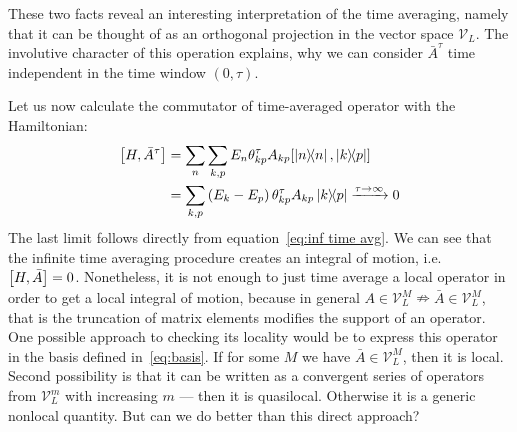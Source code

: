 These two facts reveal an interesting interpretation of the time averaging, namely that it can be
thought of as an orthogonal projection in the vector space \(\mathcal{V}_L\). The involutive character of this operation explains,
why we can consider \(\bar{A}^{\tau}\) time independent in the time window \(\left(0,\tau\right)\).

Let us now calculate the commutator of time-averaged operator with the Hamiltonian:
\begin{align}
  \comm{H}{\bar{A}^{\tau}} & = \sum_n \sum_{k,p} E_n \theta_{kp}^{\tau} A_{kp} \comm{ \ketbra{n}{n}}{ \ketbra{k}{p}} \nonumber         \\
                           & = \sum_{k,p} \left(E_k-E_p\right) \theta_{kp}^{\tau} A_{kp} \ketbra{k}{p} \xrightarrow{\tau \to \infty} 0 \label{eq:time averaged commutator}
\end{align}
The last limit follows directly from equation~\eqref{eq:inf time avg}. We can see that the infinite time averaging procedure
creates an integral of motion, i.e. \(\comm{H}{\bar{A}} = 0\). Nonetheless, it is not enough to just time average a
local operator in order to get a local integral of motion, because in general \(A\in \mathcal{V}_L^M  \nRightarrow \bar{A} 
\in \mathcal{V}_L^M\), that is the truncation of matrix elements modifies the support of an operator.
One possible approach to checking its locality would be to
express this operator in the basis defined in~\eqref{eq:basis}. If for some \(M\) we have \(\bar{A}\in \mathcal{V}_L^M\),
then it is local. Second possibility is that it can be written as a convergent series of operators from \(\mathcal{V}_L^m\) with
increasing \(m\) --- then it is quasilocal. Otherwise it is a generic nonlocal quantity. But can we do better than this
direct approach?

